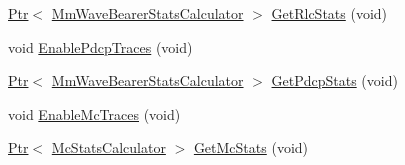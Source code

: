 \begin{DoxyCompactItemize}
\hyperlink{classns3_1_1Ptr}{Ptr}$<$ \hyperlink{classns3_1_1MmWaveBearerStatsCalculator}{Mm\+Wave\+Bearer\+Stats\+Calculator} $>$ \hyperlink{classns3_1_1MmWaveHelper_a59f23626d9d11e1acf9c92cf9fb3d82d}{Get\+Rlc\+Stats} (void)
\item 
void \hyperlink{classns3_1_1MmWaveHelper_a170d2eb818d748a1306afec19816ef2e}{Enable\+Pdcp\+Traces} (void)
\item 
\hyperlink{classns3_1_1Ptr}{Ptr}$<$ \hyperlink{classns3_1_1MmWaveBearerStatsCalculator}{Mm\+Wave\+Bearer\+Stats\+Calculator} $>$ \hyperlink{classns3_1_1MmWaveHelper_a1f8586dc9598ba56e9bc743f80e21f5b}{Get\+Pdcp\+Stats} (void)
\item 
void \hyperlink{classns3_1_1MmWaveHelper_a8034dbe461d4495dd153b08af0796aa6}{Enable\+Mc\+Traces} (void)
\item 
\hyperlink{classns3_1_1Ptr}{Ptr}$<$ \hyperlink{classns3_1_1McStatsCalculator}{Mc\+Stats\+Calculator} $>$ \hyperlink{classns3_1_1MmWaveHelper_a9af8d93bac7836254eb3f4cf1616ebe1}{Get\+Mc\+Stats} (void)
\end{DoxyCompactItemize}
